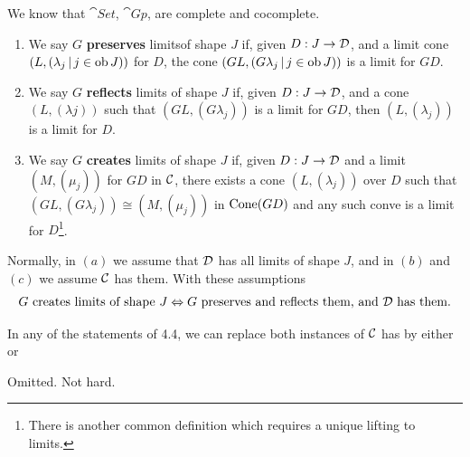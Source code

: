 \documentclass{article}
\begin{document}
We know that $\cat{Set}$, $\cat{Gp}$,  are complete and cocomplete.
\begin{fancydefine}{}\hspace{0.1cm}
    \begin{enumerate}
    \item[(a)] We say $G$ \textbf{preserves} limitsof shape $J$ if, given $D: J \to \mathcal{D}$, and a limit cone $(L, (\lambda_{j} \, | \, j \in \operatorname{ob} J))$ for $D$, the cone $(GL, (G\lambda_{j} \, | \, j \in \operatorname{ob} J))$ is a limit for $GD$.
    \item[(b)] We say $G$ \textbf{reflects} limits of shape $J$ if, given $D : J \to \mathcal{D}$, and a cone $(L, (\lambda j))$ such that $(GL, (G\lambda_{j}))$ is a limit for $GD$, then $(L, (\lambda_{j}))$ is a limit for $D$.
    \item[(c)] We say $G$ \textbf{creates} limits of shape $J$ if, given $D : J \to \mathcal{D}$ and a limit $(M, (\mu_{j}))$ for $GD$ in $\mathcal{C}$, there exists a cone $(L, (\lambda_{j}))$ over $D$ such that $(GL, (G\lambda_{j})) \cong (M, (\mu_{j}))$ in $\operatorname{Cone}(GD)$ and any such conve is a limit for $D$\footnote{There is another common definition which requires a unique lifting to limits.}.
    \end{enumerate}
    Normally, in $(a)$ we assume that $\mathcal{D}$ has all limits of shape $J$, and in $(b)$ and $(c)$ we assume $\mathcal{C}$ has them. With these assumptions \[ \text{$G$ creates limits of shape $J$} \Leftrightarrow \text{$G$ preserves and reflects them, and $\mathcal{D}$ has them.} \]
\end{fancydefine}
\begin{corr}{}
    In any of the statements of 4.4, we can replace both instances of $\mathcal{C}$ has by either  or 
\end{corr}
\proof Omitted. Not hard.
\end{document}
